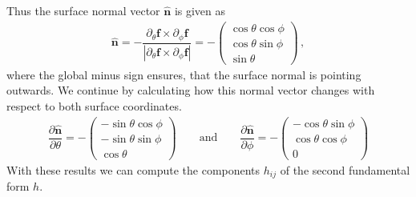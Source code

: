 \documentclass[11pt, DINA4, fleqn]{amsart}
\def\vn{\boldsymbol{n}\xspace}
\def\vf{\boldsymbol{f}\xspace}
\begin{document}
Thus the surface normal vector $\hat{\vn}$ is given as
\begin{align}
\hat{\vn} = -\dfrac{\partial_{\theta}\vf \times \partial_{\phi}\vf}{|\partial_{\theta}\vf \times \partial_{\phi}\vf |}
= -
\begin{pmatrix}
\cos \theta \cos \phi \\
\cos \theta \sin \phi \\
\sin \theta
\end{pmatrix} \, ,
\end{align}
where the global minus sign ensures, that the surface normal is pointing outwards.
We continue by calculating how this normal vector changes with respect to both surface coordinates.
\begin{align}
\dfrac{\partial \hat{\vn}}{\partial \theta} = -\begin{pmatrix}
-\sin \theta \cos\phi \\
-\sin \theta \sin\phi \\
\cos \theta
\end{pmatrix}
\qquad \text{and} \qquad
\dfrac{\partial \hat{\vn}}{\partial \phi} = -\begin{pmatrix}
-\cos \theta \sin\phi \\
\cos \theta \cos\phi \\
0
\end{pmatrix}
\end{align}
With these results we can compute the components $h_{ij}$ of the second fundamental form $h$.
\end{document}
